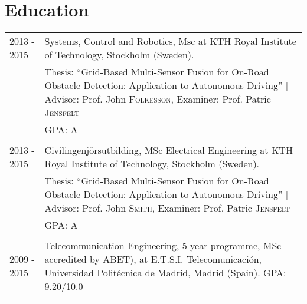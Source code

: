 \documentclass[a4paper,12pt]{article} %
\begin{document}
\section{Education}
\begin{tabular}{R{4cm}|L{11cm}}	
2013 - 2015 & Systems, Control and Robotics, Msc at KTH Royal Institute of Technology, Stockholm (Sweden). \\
& Thesis: ``Grid-Based Multi-Sensor Fusion for On-Road Obstacle Detection: Application to Autonomous Driving'' | \small Advisor: Prof. John \textsc{Folkesson}, \small Examiner: Prof. Patric \textsc{Jensfelt}\\
&\normalsize \textsc{GPA}: A\\
&\\


2013 - 2015 & Civilingenjörsutbilding, MSc Electrical Engineering at KTH Royal Institute of Technology, Stockholm (Sweden). \\
& Thesis: ``Grid-Based Multi-Sensor Fusion for On-Road Obstacle Detection: Application to Autonomous Driving'' | \small Advisor: Prof. John \textsc{Smith}, \small Examiner: Prof. Patric \textsc{Jensfelt}\\
&\normalsize \textsc{GPA}: A\\
&\\


2009 - 2015 & Telecommunication Engineering, 5-year programme, MSc accredited by ABET), at E.T.S.I. Telecomunicación, Universidad Politécnica de Madrid, Madrid (Spain). GPA: 9.20/10.0\\
&\\


\end{tabular}


\end{document}
